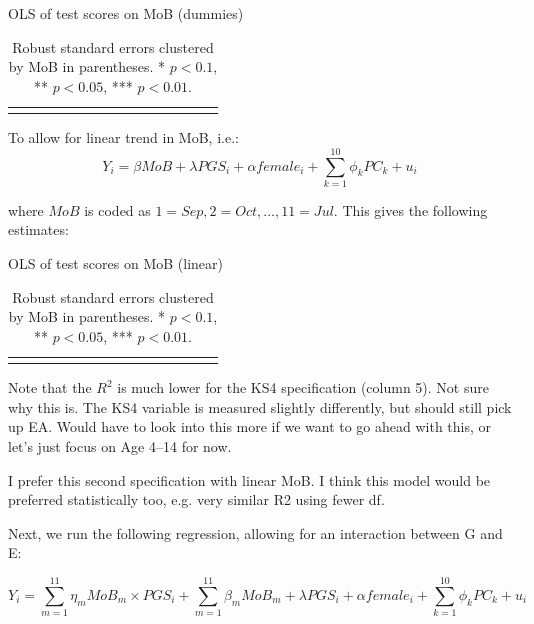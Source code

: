 \documentclass[a4paper,12pt]{article}
\begin{document}
\bigskip \bigskip 

\begin{table}[H]
\caption{OLS of test scores on MoB (dummies)}
\centering
{\footnotesize
\begin{tabular}{lcccccccccccccc}
\toprule

\bottomrule
\addlinespace[.75ex]
\end{tabular}
\caption*{\scriptsize{Robust standard errors clustered by MoB in parentheses. * $p < 0.1$, ** $p < 0.05$, *** $p < 0.01$.}}
}
\end{table}


To allow for linear trend in MoB, i.e.:
\begin{equation*} 
Y_i = \beta MoB + \lambda PGS_i + \alpha female_i + \sum_{k=1}^{10} \phi_k PC_k + u_i
\end{equation*} 

where $MoB$ is coded as $1=Sep, 2=Oct, \ldots, 11=Jul$. This gives the following estimates:

\bigskip \bigskip

\begin{table}[H]
\caption{OLS of test scores on MoB (linear)}
\centering
{\footnotesize
\begin{tabular}{lcccccccccccccc}
\toprule

\bottomrule
\addlinespace[.75ex]
\end{tabular}
\caption*{\scriptsize{Robust standard errors clustered by MoB in parentheses. * $p < 0.1$, ** $p < 0.05$, *** $p < 0.01$.}}
}
\end{table}


Note that the $R^2$ is much lower for the KS4 specification (column 5). Not sure why this is. The KS4 variable is measured slightly differently, but should still pick up EA. Would have to look into this more if we want to go ahead with this, or let's just focus on Age 4--14 for now.

I prefer this second specification with linear MoB. I think this model would be preferred statistically too, e.g. very similar R2 using fewer df.


\clearpage
Next, we run the following regression, allowing for an interaction between G and E:

\begin{equation*} 
Y_i =  \sum_{m=1}^{11} \eta_m MoB_{m} \times PGS_i + \sum_{m=1}^{11} \beta_m MoB_{m} + \lambda PGS_i + \alpha female_i + \sum_{k=1}^{10} \phi_k PC_k + u_i
\end{equation*} 
\end{document}
